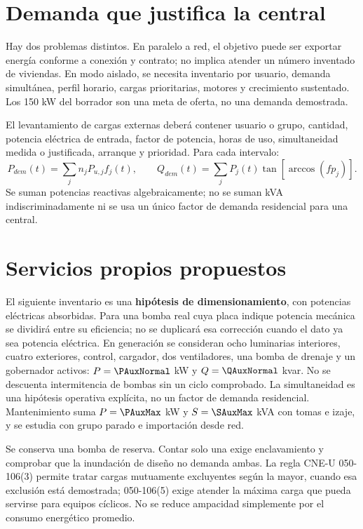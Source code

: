 \section{Demanda que justifica la central}
Hay dos problemas distintos. En paralelo a red, el objetivo puede ser exportar energía conforme a conexión y contrato; no implica atender un número inventado de viviendas. En modo aislado, se necesita inventario por usuario, demanda simultánea, perfil horario, cargas prioritarias, motores y crecimiento sustentado. Los 150 kW del borrador son una meta de oferta, no una demanda demostrada.

El levantamiento de cargas externas deberá contener usuario o grupo, cantidad, potencia eléctrica de entrada, factor de potencia, horas de uso, simultaneidad medida o justificada, arranque y prioridad. Para cada intervalo:
\[
P_{dem}(t)=\sum_j n_jP_{u,j}f_j(t),\qquad
Q_{dem}(t)=\sum_j P_j(t)\tan[\arccos(fp_j)].
\]
Se suman potencias reactivas algebraicamente; no se suman kVA indiscriminadamente ni se usa un único factor de demanda residencial para una central.

\section{Servicios propios propuestos}
El siguiente inventario es una \textbf{hipótesis de dimensionamiento}, con potencias eléctricas absorbidas. Para una bomba real cuya placa indique potencia mecánica se dividirá entre su eficiencia; no se duplicará esa corrección cuando el dato ya sea potencia eléctrica.
\small\normalsize
\small\normalsize
En generación se consideran ocho luminarias interiores, cuatro exteriores, control, cargador, dos ventiladores, una bomba de drenaje y un gobernador activos: $P=\PAuxNormal$ kW y $Q=\QAuxNormal$ kvar. No se descuenta intermitencia de bombas sin un ciclo comprobado. La simultaneidad es una hipótesis operativa explícita, no un factor de demanda residencial. Mantenimiento suma $P=\PAuxMax$ kW y $S=\SAuxMax$ kVA con tomas e izaje, y se estudia con grupo parado e importación desde red.

Se conserva una bomba de reserva. Contar solo una exige enclavamiento y comprobar que la inundación de diseño no demanda ambas. La regla CNE-U 050-106(3) permite tratar cargas mutuamente excluyentes según la mayor, cuando esa exclusión está demostrada; 050-106(5) exige atender la máxima carga que pueda servirse para equipos cíclicos. No se reduce ampacidad simplemente por el consumo energético promedio.

